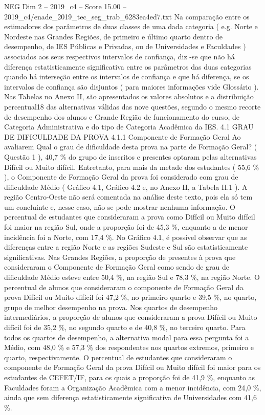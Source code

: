 \begin{textsample}{NEG Dim 2 – 2019\_c4 – Score 15.00 – 2019\_c4/enade\_2019\_tec\_seg\_trab\_6283ea4ed7.txt}
Na comparação entre os estimadores dos parâmetros de duas classes de uma dada categoria ( e.g.
Norte e Nordeste nas Grandes Regiões, de primeiro e último quarto dentro de desempenho, de IES Públicas e Privadas, ou de Universidades e Faculdades ) associados aos seus respectivos intervalos de confiança, diz -se que não há diferença estatisticamente significativa entre os parâmetros das duas categorias quando há interseção entre os intervalos de confiança e que há diferença, se os intervalos de confiança são disjuntos ( para maiores informações vide Glossário ).
Nas Tabelas no Anexo II, são apresentados os valores absolutos e a distribuição percentual18 das alternativas válidas das nove questões, segundo o mesmo recorte de desempenho dos alunos e Grande Região de funcionamento do curso, de Categoria Administrativa e do tipo de Categoria Acadêmica da IES. 4.1 GRAU DE DIFICULDADE DA PROVA 4.1.1 Componente de Formação Geral Ao avaliarem Qual o grau de dificuldade desta prova na parte de Formação Geral? ( Questão 1 ), 40,7 \% do grupo de inscritos e presentes optaram pelas alternativas Difícil ou Muito difícil.
Entretanto, para mais da metade dos estudantes ( 55,6 \% ), o Componente de Formação Geral da prova foi considerado com grau de dificuldade Médio ( Gráfico 4.1, Gráfico 4.2 e, no Anexo II, a Tabela II.1 ).
A região Centro-Oeste não será comentada na análise deste texto, pois ela só tem um concluinte e, nesse caso, não se pode mostrar nenhuma informação.
O percentual de estudantes que consideraram a prova como Difícil ou Muito difícil foi maior na região Sul, onde a proporção foi de 45,3 \%, enquanto a de menor incidência foi a Norte, com 17,4 \%.
No Gráfico 4.1, é possível observar que as diferenças entre a região Norte e as regiões Sudeste e Sul são estatisticamente significativas.
Nas Grandes Regiões, a proporção de presentes à prova que consideraram o Componente de Formação Geral como sendo de grau de dificuldade Médio esteve entre 50,4 \%, na região Sul e 78,3 \%, na região Norte.
O percentual de alunos que consideraram o componente de Formação Geral da prova Difícil ou Muito difícil foi 47,2 \%, no primeiro quarto e 39,5 \%, no quarto, grupo de melhor desempenho na prova.
Nos quartos de desempenho intermediários, a proporção de alunos que consideraram a prova Difícil ou Muito difícil foi de 35,2 \%, no segundo quarto e de 40,8 \%, no terceiro quarto.
Para todos os quartos de desempenho, a alternativa modal para essa pergunta foi a Médio, com 48,0 \% e 57,3 \% dos respondentes nos quartos extremos, primeiro e quarto, respectivamente.
O percentual de estudantes que consideraram o componente de Formação Geral da prova Difícil ou Muito difícil foi maior para os estudantes de CEFET/IF, para os quais a proporção foi de 41,9 \%, enquanto as Faculdades foram a Organização Acadêmica com a menor incidência, com 24,0 \%, ainda que sem diferença estatisticamente significativa de Universidades com 41,6 \%.

\end{textsample}

